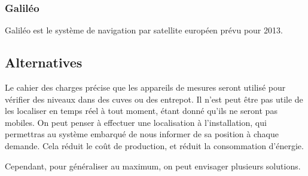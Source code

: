         \subsubsection{Galiléo}
	        Galiléo est le système de navigation par satellite européen prévu pour 2013.
	        
    \subsection{Alternatives}
        Le cahier des charges précise que les appareils de mesures seront utilisé pour vérifier des niveaux dans des cuves ou des entrepot.
        Il n'est peut être pas utile de les localiser en temps réel à tout moment, étant donné qu'ils ne seront pas mobiles.
        On peut penser à effectuer une localisation à l'installation, qui permettras au système embarqué de nous informer de sa position à chaque demande.
        Cela réduit le coût de production, et réduit la consommation d'énergie.
        
        Cependant, pour généraliser au maximum, on peut envisager plusieurs solutions.
